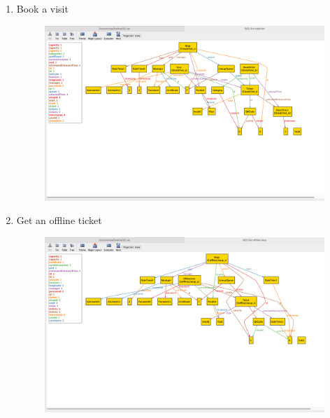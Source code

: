 \begin{enumerate}
    \item Book a visit \\
    \begin{figure}[H]
      \centering
      \includegraphics[width=0.9\textheight,keepaspectratio, angle=90]{images/alloy_BookVisit.png}
    \end{figure}
    \clearpage
    
    \item Get an offline ticket \\
    \begin{figure}[H]
      \centering
      \includegraphics[width=0.9\textheight,keepaspectratio, angle=90]{images/alloy_OfflineLineup.png}
    \end{figure}
    \clearpage
    

\end{enumerate}
